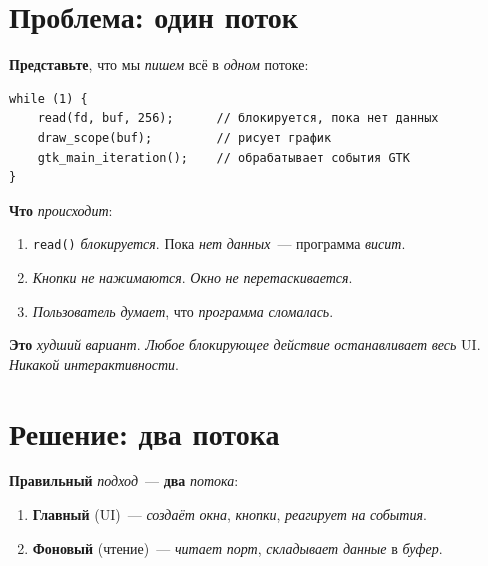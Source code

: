 \section{Проблема: один поток}
\label{sec:pc-problem}

\textbf{Представьте}, что мы \emph{пишем} всё в \emph{одном}
потоке:

\begin{listing}[htbp]
\begin{verbatim}
while (1) {
    read(fd, buf, 256);      // блокируется, пока нет данных
    draw_scope(buf);         // рисует график
    gtk_main_iteration();    // обрабатывает события GTK
}
\end{verbatim}
\caption{Наивный подход: всё в одном потоке}
\label{lst:pc-naive}
\end{listing}

\textbf{Что} \emph{происходит}:
\begin{enumerate}
    \item \texttt{read()} \emph{блокируется}. Пока \emph{нет}
          \emph{данных}~--- программа \emph{висит}.
    \item \emph{Кнопки} \emph{не} \emph{нажимаются}. \emph{Окно}
          \emph{не} \emph{перетаскивается}.
    \item \emph{Пользователь} \emph{думает}, что \emph{программа}
          \emph{сломалась}.
\end{enumerate}

\begin{warnbox}
\textbf{Это} \emph{худший} \emph{вариант}. \emph{Любое}
\emph{блокирующее} \emph{действие} \emph{останавливает}
\emph{весь} UI. \emph{Никакой} \emph{интерактивности}.
\end{warnbox}

\section{Решение: два потока}
\label{sec:pc-solution}

\textbf{Правильный} \emph{подход}~--- \textbf{два} \emph{потока}:
\begin{enumerate}
    \item \textbf{Главный} (UI)~--- \emph{создаёт} \emph{окна},
          \emph{кнопки}, \emph{реагирует} \emph{на} \emph{события}.
    \item \textbf{Фоновый} (чтение)~--- \emph{читает} \emph{порт},
          \emph{складывает} \emph{данные} в \emph{буфер}.
\end{enumerate}


